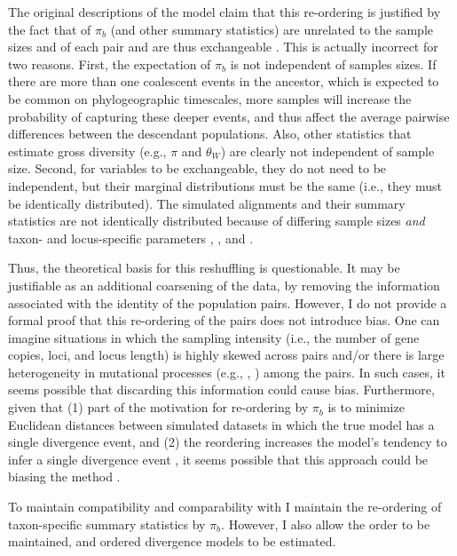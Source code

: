 The original descriptions of the \msb model claim that this re-ordering is
justified by the fact that of $\pi_b$ (and other summary statistics) are
unrelated to the sample sizes  and  of
each pair and are thus exchangeable \citep{Hickerson2006,Huang2011}.
This is actually incorrect for two reasons.
First, the expectation of $\pi_b$ is not independent of samples sizes.
If there are more than one coalescent events in the ancestor, which is expected
to be common on phylogeographic timescales, more samples will increase the
probability of capturing these deeper events, and thus affect the average
pairwise differences between the descendant populations.
Also, other statistics that estimate gross diversity (e.g., $\pi$ and
$\theta_W$) are clearly not independent of sample size.
Second, for variables to be exchangeable, they do not need to be independent,
but their marginal distributions must be the same (i.e., they must be
identically distributed).
The simulated alignments and their summary statistics are not identically
distributed because of differing sample sizes \emph{and} taxon- and
locus-specific parameters \hkyModel{}{}, \mutationRateScalarConstant{}{}, and
\ploidyScalar{}{}.

Thus, the theoretical basis for this reshuffling is questionable.
It may be justifiable as an additional coarsening of the data,
by removing the information associated with the identity of the
population pairs.
However, I do not provide a formal proof that this re-ordering of the pairs
does not introduce bias.
One can imagine situations in which the sampling intensity (i.e., the
number of gene copies, loci, and locus length) is highly skewed across
pairs and/or there is large heterogeneity in mutational processes
(e.g., \hkyModel{}{}, \mutationRateScalarConstant{}{}) among the pairs.
In such cases, it seems possible that discarding this information could
cause bias.
Furthermore, given that (1) part of the motivation for re-ordering by $\pi_b$
is to minimize Euclidean distances between simulated datasets in which the true
model has a single divergence event, and (2) the reordering increases the
model's tendency to infer a single divergence event \citep{Huang2011}, it seems
possible that this approach could be biasing the method \citep{Oaks2012}.

To maintain compatibility and comparability with \msb I maintain
the re-ordering of taxon-specific summary statistics by $\pi_b$.
However, I also allow the order to be maintained, and ordered
divergence models to be estimated.

